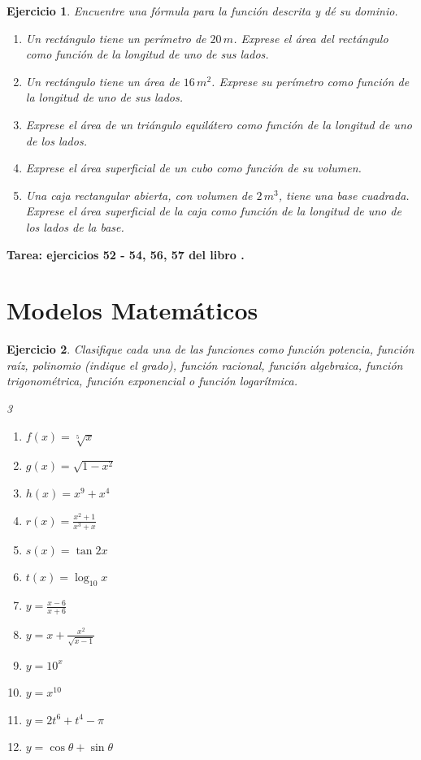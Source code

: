 \documentclass[12pt,tikz,border=5pt]{article}
\newtheorem{ejercicio}{Ejercicio}[section]
\begin{document}
\begin{ejercicio}
  Encuentre una fórmula para la función descrita y dé su dominio. 
  \begin{enumerate}[label=(\alph*)]
    \item Un rectángulo tiene un perímetro de $20\,m$. Exprese el área del rectángulo como función de la longitud de uno de sus lados.
    \item Un rectángulo tiene un área de $16\,m^2$. Exprese su perímetro como función de la longitud de uno de sus lados.
    \item Exprese el área de un triángulo equilátero como función de la longitud de uno de los lados.
    \item Exprese el área superficial de un cubo como función de su volumen.
    \item Una caja rectangular abierta, con volumen de $2\,m^3$, tiene una base cuadrada. Exprese el área superficial de la caja como función de la longitud de uno de los lados de la base.
  \end{enumerate}
\end{ejercicio}
\textbf{Tarea: ejercicios 52 - 54, 56, 57 del libro \citep{stewart2001calculo}.}

\newpage
\section{Modelos Matemáticos}

\begin{ejercicio}
  Clasifique cada una de las funciones como función potencia, función raíz, polinomio (indique el grado), función racional, función algebraica, función trigonométrica, función exponencial o función logarítmica.
  \begin{multicols}{3}
    \begin{enumerate}[label=(\alph*)]
      \item $f(x) = \sqrt[5]{x}$
      \item $g(x) = \sqrt{1-x^{2}}$
      \item $h(x) = x^{9} + x^{4}$
      \item $r(x) = \displaystyle\frac{x^{2} + 1}{x^{3} + x}$
      \item $s(x) = \tan{2x}$
      \item $t(x) = \log_{10}x$
      \item $y = \displaystyle\frac{x - 6}{x + 6}$
      \item $y = x + \displaystyle\frac{x^{2}}{\sqrt{x - 1}}$
      \item $y = 10^{x}$
      \item $y = x^{10}$
      \item $y = 2t^{6} + t^{4} - \pi$
      \item $y = \cos{\theta} + \sin{\theta}$
    \end{enumerate}
  \end{multicols}
\end{ejercicio}
\end{document}
